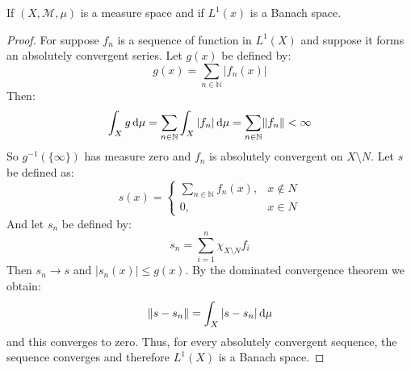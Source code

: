 \documentclass[crop=false,class=article]{standalone}                           %
\begin{document}
        \begin{theorem}
            If $(X,\mathcal{M},\mu)$ is a measure space and if $L^{1}(x)$ is a
            Banach space.
        \end{theorem}
        \begin{proof}
            For suppose $f_{n}$ is a sequence of function in $L^{1}(X)$ and
            suppose it forms an absolutely convergent series. Let $g(x)$ be
            defined by:
            \begin{equation}
                g(x)=\sum_{n\in\mathbb{N}}|f_{n}(x)|
            \end{equation}
            Then:
            \begin{equation}
                \int_{X}g\mathop{}\!\mathrm{d}{\mu}
                =\sum_{n\in\mathbb{N}}\int_{X}|f_{n}|\mathop{}\!\mathrm{d}{\mu}
                =\sum_{n\in\mathbb{N}}\lVert f_{n}\rVert<\infty
            \end{equation}
            So $g^{\minus{1}}(\{\infty\})$ has measure zero and $f_{n}$ is
            absolutely convergent on $X\setminus{N}$. Let $s$ be defined as:
            \begin{equation}
                s(x)=
                \begin{cases}
                    \sum_{n\in\mathbb{N}}f_{n}(x),&x\notin{N}\\
                    0,&x\in{N}
                \end{cases}
            \end{equation}
            And let $s_{n}$ be defined by:
            \begin{equation}
                s_{n}=\sum_{i=1}^{n}\chi_{X\setminus{N}}f_{i}
            \end{equation}
            Then $s_{n}\rightarrow{s}$ and $|s_{n}(x)|\leq{g}(x)$. By the
            dominated convergence theorem we obtain:
            \begin{equation}
                \lVert s-s_{n}\rVert=\int_{X}|s-s_{n}|\mathop{}\!\mathrm{d}{\mu}
            \end{equation}
            and this converges to zero. Thus, for every absolutely convergent
            sequence, the sequence converges and therefore $L^{1}(X)$ is a
            Banach space.
        \end{proof}
\end{document}
